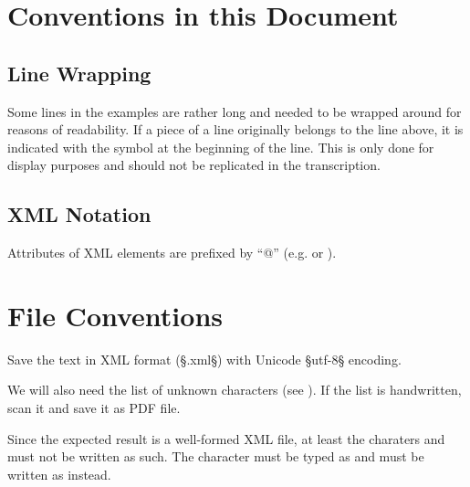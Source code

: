 


\section{Conventions in this Document}
\label{sec:conv-this-docum}

\subsection{Line Wrapping}
\label{sec:line-wrapping}

Some lines in the examples are rather long and needed to be wrapped around for reasons of readability. If a piece of a line originally belongs to the line above, it is indicated with the symbol  at the beginning of the line. This is only done for display purposes and should not be replicated in the transcription.

\subsection{XML Notation}
\label{sec:xml-notation}

Attributes of XML elements are prefixed by ``@'' (e.g.  or ).
\section{File Conventions}
\label{section file conventions}

\begin{mainruleLessImportant}
Save the text in XML format (§.xml§) with Unicode §utf-8§ encoding.

We will also need the list of unknown characters (see ). If the list is handwritten, scan it and save it as PDF file.
\end{mainruleLessImportant}

Since the expected result is a well-formed XML file, at least the charaters \xmex{\&} and \xmex{<} must not be written as such. The character \xmex{\&} must be typed as  and \xmex{<} must be written as  instead.


